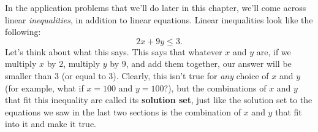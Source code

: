 \setcounter{ExampleCounter}{1}
\begin{comment}
\begin{center}
\begin{tikzpicture}
\begin{axis}[
    xmin=-10, xmax=10,
    ymin=-10, ymax=10,
    axis lines=center,
    axis on top=false,
    domain=0:1,
    x=0.5cm,
    y=0.5cm,
    xtick={-10,-9,...,10},
    xticklabels={-10,-9,...,10},
    ytick={-10,-9,...,10},
    yticklabels={-10,-9,...,10},
    axis lines=middle,
    axis line style={->},
    xlabel={$x$},
    ylabel={$y$},
    grid=major
    ]
    \addplot [only marks,color=orange!30!black] table {
	-1.333 1.667
	};
	\addplot [thick,color=blue,fill=blue!50!cyan, 
                    fill opacity=0.15,draw opacity=0]coordinates {
            (7, 10)
            (10,10)
            (10,-10)
            (-10,-10)
            (-10, -7)  };
    \addplot [thick,color=blue,fill=red!70!white, 
                    fill opacity=0.1,draw opacity=0]coordinates {
            (-11/2, 10) 
            (9/2, -10)
            (-10,-10)
            (-10, 10)  };
	\draw [yshift=12.5cm,xshift=4.5cm] node [fill=white] {\large\color{orange!30!black}$(x,y)$};
	\addplot [very thick,blue,dashed,domain=-10:10] {x+3};
	\addplot [very thick,red!50!black,domain=-10:10] {-2*x-1};
\end{axis}
\end{tikzpicture}
\end{center}
\end{comment}

In the application problems that we'll do later in this chapter, we'll come across linear \emph{inequalities}, in addition to linear equations.  Linear inequalities look like the following:
\[2x+9y \leq 3.\]
Let's think about what this says.  This says that whatever $x$ and $y$ are, if we multiply $x$ by 2, multiply $y$ by 9, and add them together, our answer will be smaller than 3 (or equal to 3).  Clearly, this isn't true for \emph{any} choice of $x$ and $y$ (for example, what if $x=100$ and $y=100$?), but the combinations of $x$ and $y$ that fit this inequality are called its \textbf{solution set}, just like the solution set to the equations we saw in the last two sections is the combination of $x$ and $y$ that fit into it and make it true.

